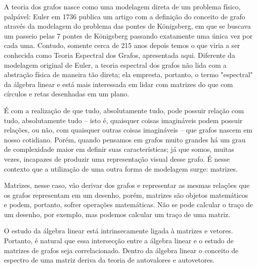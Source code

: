 


A teoria dos grafos nasce como uma modelagem direta de um problema físico, palpável: Euler em 1736 publica um artigo com a definição do conceito de grafo através da modelagem do problema das pontes de Königsberg, em que se buscava um passeio pelas 7 pontes de Königsberg passando exatamente uma única vez por cada uma. Contudo, somente cerca de 215 anos depois temos o que viria a ser conhecida como Teoria Espectral dos Grafos, apresentada aqui. Diferente da modelagem original de Euler, a teoria espectral dos grafos não lida com a abstração física de maneira tão direta; ela empresta, portanto, o termo "espectral" da álgebra linear e está mais interessada em lidar com matrizes do que com círculos e retas desenhadas em um plano. 

É com a realização de que tudo, absolutamente tudo, pode possuir relação com tudo, absolutamente tudo -- isto é, quaisquer coisas imagináveis podem possuir relações, ou não, com quaisquer outras coisas imagináveis -- que grafos nascem em nosso cotidiano. Porém, quando pensamos em grafos muito grandes há um grau de complexidade maior em definir suas características; já que somos, muitas vezes, incapazes de produzir uma representação visual desse grafo. É nesse contexto que a utilização de uma outra forma de modelagem surge: matrizes.

Matrizes, nesse caso, vão derivar dos grafos e representar as mesmas relações que os grafos representam em um desenho, porém, matrizes são objetos matemáticos e podem, portanto, sofrer operações matemáticas. Não se pode calcular o traço de um desenho, por exemplo, mas podemos calcular um traço de uma matriz.

O estudo da álgebra linear está intrinsecamente ligada à matrizes e vetores. Portanto, é natural que essa intersecção entre a álgebra linear e o estudo de matrizes de grafos seja correlacionado. Dentro da álgebra linear o conceito de espectro de uma matriz deriva da teoria de autovalores e autovetores. 




